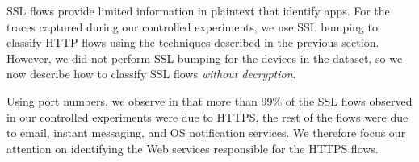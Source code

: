 SSL flows provide limited information in plaintext that identify apps. 
For the traces captured during our controlled experiments, we use SSL bumping to classify HTTP flows using 
the techniques described in the previous section. 
However, we did not perform SSL bumping for the devices in the \mobWild dataset, so we now describe how to 
classify SSL flows \emph{without decryption}. 


Using port numbers, we observe in that more than 99\% of the SSL flows observed in our controlled experiments were due to HTTPS, the rest of the flows were due to email, instant messaging, and OS notification services. 
We therefore focus our attention on identifying the Web services responsible for the HTTPS flows. 


